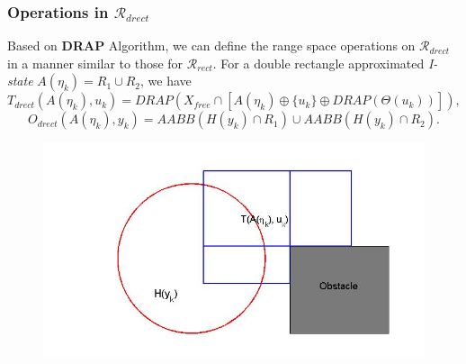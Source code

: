 \documentclass[compress]{beamer}
\begin{document}
\begin{frame} \frametitle{Operations in $\mathcal{R}_{drect}$}

Based on \textbf{DRAP} Algorithm, we can define the range space operations on
$\mathcal{R}_{drect}$ in a manner similar to those for $\mathcal{R}_{rect}$.  For a double rectangle
approximated \emph{I-state} $A(\eta_k) = R_1 \cup R_2$, we have
\begin{equation}
	T_{drect}(A(\eta_k), u_k) = DRAP(X_{free} \cap [A(\eta_k) \oplus \{ u_k \} \oplus DRAP(\Theta(u_k))]),
\end{equation}
\begin{equation}
	O_{drect}(A(\eta_k), y_k) = AABB(H(y_k) \cap R_1)\cup AABB(H(y_k) \cap R_2).
\end{equation}
\begin{figure}
    \includegraphics[scale=0.3]{drectevolve3.jpg}
    \end{figure}
\transboxout
\end{frame}
\end{document}

